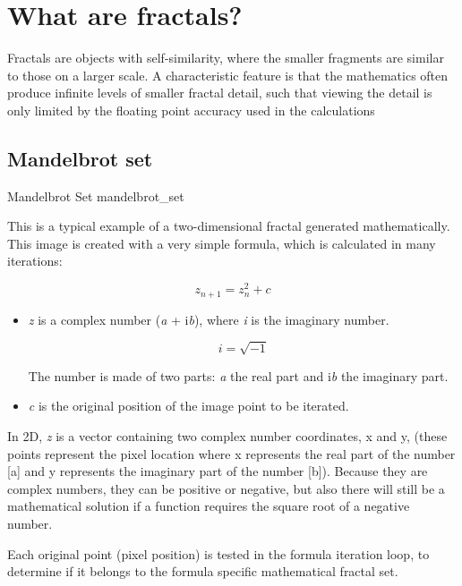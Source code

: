 \section{What are fractals?}\label{what-are-fractals}

Fractals are objects with self-similarity, where the smaller fragments are
similar to those on a larger scale. A characteristic feature is that the mathematics often produce infinite levels of smaller fractal detail, such that viewing the detail is only limited by the floating point accuracy used in the calculations

\subsection{Mandelbrot set}\label{mandelbrot-set}

{Mandelbrot Set}
{mandelbrot_set}

This is a typical example of a two-dimensional fractal generated mathematically.
This image is created with a very simple formula, which is calculated in many
iterations:

\[z_{n + 1} = z_{n}^{2} + c\]

\begin{itemize}
		
		
	\item\emph{z} is a complex number (\emph{a} + i\emph{b}), where \emph{i} is
	the imaginary number.
		
	\[ i = \sqrt{-1} \]
		
	The number is made of two parts: \emph{a} the real part and i\emph{b} the
	imaginary part.
		
	\item\emph{c} is the original position of the image point to be iterated.
\end{itemize}

In 2D, \emph{z} is a vector containing two complex number coordinates, x and y,
(these points represent the pixel location where x represents the real part of
the number {[}a{]} and y represents the imaginary part of the number {[}b{]}).
Because they are complex numbers, they can be positive or negative, but also
there will still be a mathematical solution if a function requires the square
root of a negative number.

Each original point (pixel position) is tested in the formula iteration loop, to
determine if it belongs to the formula specific mathematical fractal set.

